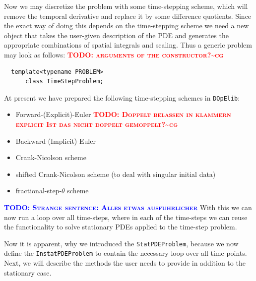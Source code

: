 \documentclass[prodmode,acmtoms]{acmsmall}
\numberwithin{equation}{section}
\newcommand{\dope}{\texttt{DOpElib}}
\newcommand{\todo}[1]{\textbf{\textsc{\textcolor{blue}{TODO: #1}}}}
\newcommand{\todocg}[1]{\textbf{\textsc{\textcolor{red}{TODO: #1\textasciitilde cg}}}}
\begin{document}
Now we may discretize the problem with some time-stepping scheme, which will 
remove the temporal derivative and replace it by some difference quotients. 
Since the exact way of doing this depends on the time-stepping scheme 
we need a new object that takes the user-given description of the PDE and 
generates the appropriate combinations of spatial integrals and scaling.
Thus a generic problem may look as follows:
\todocg{arguments of the constructor?}
\begin{lstlisting}
  template<typename PROBLEM>
      class TimeStepProblem;
\end{lstlisting}
At present we have prepared the following time-stepping schemes in \dope:
\begin{itemize}
\item Forward-(Explicit)-Euler \todocg{Doppelt belassen in klammern explicit Ist das nicht doppelt gemoppelt?}
\item Backward-(Implicit)-Euler
\item Crank-Nicolson scheme
\item shifted Crank-Nicolson scheme (to deal with singular initial data)
\item fractional-step-$\theta$ scheme
\end{itemize}
\todo{Strange sentence: Alles etwas ausfuhrlicher} With this we can now run a loop over all time-steps, where in each of the 
time-steps we can reuse the functionality to solve stationary PDEs 
applied to the time-step problem. 

Now it is apparent, why we introduced the \texttt{StatPDEProblem}, because
we now define the \texttt{InstatPDEProblem} to contain the necessary 
loop over all time points. Next, we will describe the methods the user needs to 
provide in addition to the stationary case.
\end{document}
